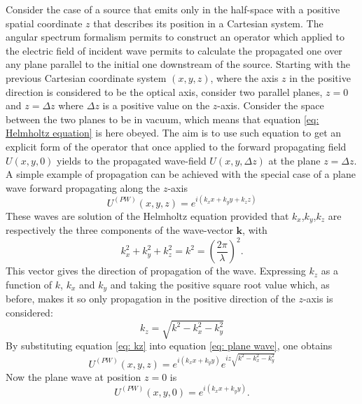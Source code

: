 \documentclass{iucr}              %
\begin{document}
Consider the case of a source that emits only in the half-space with a positive spatial coordinate $z$ that describes its position in a Cartesian system.
The angular spectrum formalism permits to construct an operator which applied to the electric field of incident wave permits to calculate the propagated one over any plane parallel to the initial one downstream of the source. Starting with the previous Cartesian coordinate system $(x,y,z)$, where the axis $z$ in the positive direction is considered to be the optical axis, consider two parallel planes, $z=0$ and $z=\Delta z$ where $\Delta z$ is a positive value on the $z$-axis. Consider the space between the two planes to be in vacuum, which means that equation \ref{eq: Helmholtz equation} is here obeyed. The aim is to use such equation to get an explicit form of the operator that once applied to the forward propagating field $U(x,y,0)$ yields to the propagated wave-field $U(x,y,\Delta z)$ at the plane $z=\Delta z$. A simple example of propagation can be achieved with the special case of a plane wave forward propagating along the $z$-axis
\begin{equation} \label{eq: plane wave}
U^{(PW)}(x,y,z)=e^{i(k_xx+k_yy+k_zz)}
\end{equation}
These waves are solution of the Helmholtz equation provided that $k_x$,$k_y$,$k_z$ are respectively the three components of the wave-vector $\bm{k}$, with
\begin{equation}\label{eq: k definition}
k_x^2+k_y^2+k_z^2 =k^2 =\left( \frac{2 \pi}{\lambda} \right)^2.
\end{equation}
This vector gives the direction of propagation of the wave. Expressing $k_z$ as a function of $k$, $k_x$ and $k_y$ and taking the positive square root value which, as before, makes it so only propagation in the positive direction of the $z$-axis is considered:
\begin{equation} \label{eq: kz}
k_z = \sqrt{k^2 -k_x^2-k_y^2}
\end{equation}
By substituting equation \ref{eq: kz} into equation \ref{eq: plane wave}, one obtains
\begin{equation}\label{eq: plane wave with no kz}
U^{(PW)}(x,y,z)=e^{i(k_xx+k_yy)}e^{iz\sqrt{k^2 -k_x^2-k_y^2}}
\end{equation}
Now the plane wave at position $z=0$ is 
\begin{equation} \label{eq: plane wave with no kz at z=0}
U^{(PW)}(x,y,0)=e^{i(k_xx+k_yy)}.
\end{equation}
\end{document}
